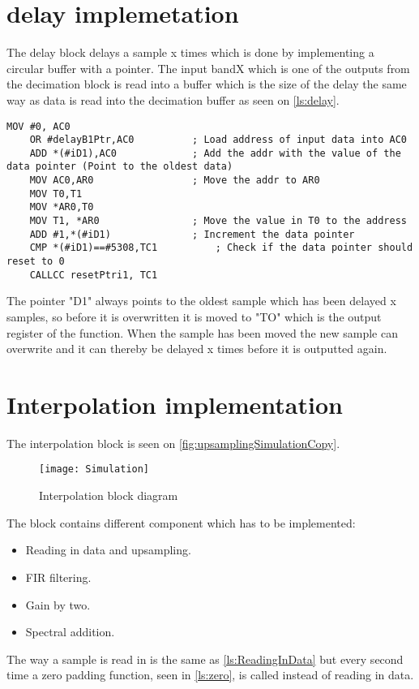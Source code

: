 \section{delay implemetation}
The delay block delays a sample x times which is done by implementing a circular buffer with a pointer. The input bandX which is one of the outputs from the decimation block is read into a buffer which is the size of the delay the same way as data is read into the decimation buffer as seen on \autoref{ls:delay}.  

\begin{lstlisting}[language={[x86masm]Assembler}, caption = {Delay algorithm.},label={ls:delay}]
	MOV #0, AC0
	OR #delayB1Ptr,AC0			; Load address of input data into AC0
	ADD *(#iD1),AC0				; Add the addr with the value of the data pointer (Point to the oldest data)
	MOV AC0,AR0					; Move the addr to AR0
	MOV T0,T1
	MOV *AR0,T0	
	MOV T1, *AR0				; Move the value in T0 to the address
	ADD #1,*(#iD1)				; Increment the data pointer
	CMP *(#iD1)==#5308,TC1			; Check if the data pointer should reset to 0
	CALLCC resetPtri1, TC1		
\end{lstlisting}

The pointer "D1" always points to the oldest sample which has been delayed x samples, so before it is overwritten it is moved to "TO" which is the output register of the function. When the sample has been moved the new sample can overwrite and it can thereby be delayed x times before it is outputted again.

\section{Interpolation implementation}
The interpolation block is seen on \autoref{fig:upsamplingSimulationCopy}.
\begin{figure}[H]
    \centering
	\texttt{[image: Simulation]}
    \caption{Interpolation block diagram}
    \label{fig:upsamplingSimulationCopy}
\end{figure}
The block contains different component which has to be implemented:
\begin{itemize}
\item Reading in data and upsampling.
\item FIR filtering.
\item Gain by two.
\item Spectral addition.
\end{itemize}
The way a sample is read in is the same as \autoref{ls:ReadingInData} but every second time a zero padding function, seen in \autoref{ls:zero}, is called instead of reading in data.  

